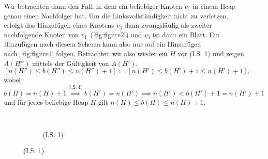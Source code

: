 \documentclass[10pt]{article}
\begin{document}
\begin{loesung}
\begin{enumerate}
\begin{beweis}
                \IS[2] Wir betrachten dann den Fall, in dem ein beliebiger Knoten $v_1$ in einem Heap genau einen Nachfolger hat.
                Um die Linksvollständigkeit nicht zu verletzen, erfolgt das Hinzufügen eines Knotens $v_3$ dann zwangsläufig als zweiter nachfolgende Knoten von $v_1$~(\autoref{fig:figure2}) und $v_3$ ist dann ein Blatt.
                Ein Hinzufügen nach diesem Schema kann also nur auf ein Hinzufügen nach~\autoref{fig:figure1} folgen.
                Betrachten wir also wieder ein $H$ vor \textsf{(I.S. 1)} und zeigen $A(H'')$ mittels der Gültigkeit von $A(H')$.
                \[
                    [n(H'') \leq b(H'') \leq n(H'') + 1] := [n(H') \leq b(H') + 1 \leq n(H') + 1],
                \]
                wobei $b(H) = n(H) + 1 \stackrel{\textsf{(I.S. 1)}}{\implies} b(H') = n(H') \implies n(H') < b(H') + 1 = n(H') + 1$ und für jedes beliebige Heap $H$ gilt $n(H) \leq b(H) \leq n(H) + 1$.
            \end{beweis}
            \begin{figure}[h]
                \caption{Induktionsschritte}
                \centering
                \begin{subfigure}{.3\textwidth}
                    \caption{{\sf(I.S. 1)}}
                    \\[1pt]
                    \centering
                     \Rightarrow
\end{subfigure}
\end{figure}
\end{enumerate}
\end{loesung}
\end{document}
